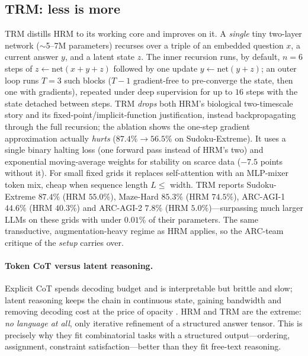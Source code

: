 \subsection{TRM: less is more}
TRM \citep{lat:jolicoeurmartineau2025trm} distills HRM to its working core and improves on it.
A \emph{single} tiny two-layer network ($\sim$5--7M parameters) recurses over a triple of an
embedded question $x$, a current answer $y$, and a latent state $z$. The inner recursion runs,
by default, $n{=}6$ steps of $z \leftarrow \mathrm{net}(x{+}y{+}z)$ followed by one update
$y \leftarrow \mathrm{net}(y{+}z)$; an outer loop runs $T{=}3$ such blocks ($T{-}1$
gradient-free to pre-converge the state, then one with gradients), repeated under deep
supervision for up to $16$ steps with the state detached between steps. TRM \emph{drops} both
HRM's biological two-timescale story and its fixed-point/implicit-function justification,
instead backpropagating through the full recursion; the ablation shows the one-step gradient
approximation actually \emph{hurts} ($87.4\%\!\to\!56.5\%$ on Sudoku-Extreme). It uses a
single binary halting loss (one forward pass instead of HRM's two) and exponential
moving-average weights for stability on scarce data ($-7.5$ points without it). For small
fixed grids it replaces self-attention with an MLP-mixer token mix, cheap when sequence length
$L \le$ width. TRM reports Sudoku-Extreme $87.4\%$ (HRM $55.0\%$), Maze-Hard $85.3\%$ (HRM
$74.5\%$), ARC-AGI-1 $44.6\%$ (HRM $40.3\%$) and ARC-AGI-2 $7.8\%$ (HRM $5.0\%$)---surpassing
much larger LLMs on these grids with under $0.01\%$ of their parameters. The same transductive,
augmentation-heavy regime as HRM applies, so the ARC-team critique of the \emph{setup} carries
over.

\paragraph{Token CoT versus latent reasoning.}
Explicit CoT spends decoding budget and is interpretable but brittle and slow; latent
reasoning keeps the chain in continuous state, gaining bandwidth and removing decoding cost at
the price of opacity \citep{lat:zhu2025survey}. HRM and TRM are the extreme: \emph{no language
at all}, only iterative refinement of a structured answer tensor. This is precisely why they
fit combinatorial tasks with a structured output---ordering, assignment, constraint
satisfaction---better than they fit free-text reasoning.

